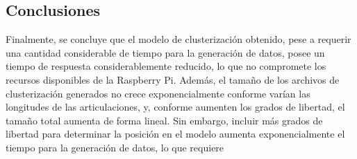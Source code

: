 \subsection{Conclusiones}

Finalmente, se concluye que el modelo de clusterización obtenido, pese a requerir una cantidad considerable de tiempo para la generación de datos, posee un tiempo de respuesta considerablemente reducido, lo que no compromete los recursos disponibles de la Raspberry Pi. Además, el tamaño de los archivos de clusterización generados no crece exponencialmente conforme varían las longitudes de las articulaciones, y, conforme aumenten los grados de libertad, el tamaño total aumenta de forma lineal. Sin embargo, incluir más grados de libertad para determinar la posición en el modelo aumenta exponencialmente el tiempo para la generación de datos, lo que requiere 